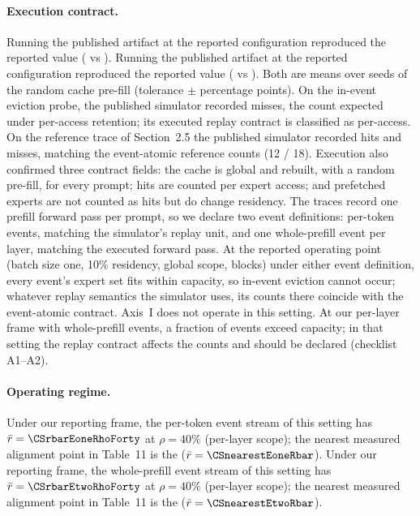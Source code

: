 \paragraph{Execution contract.}
Running the published artifact at the reported configuration reproduced the
reported value (\CSreproInfinity{} vs \CSreportedInfinity{}). Running the
published artifact at the reported configuration reproduced the reported value
(\CSreproBeyond{} vs \CSreportedBeyond{}). Both are means over \CSseeds{} seeds of the
random cache pre-fill (tolerance $\pm$\CSreproTolerance{} percentage points).
On the in-event
eviction probe, the published simulator recorded \CSprobeAtwoMisses{} misses,
the count expected under per-access retention; its executed replay contract is
classified as per-access. On the reference trace of Section~2.5 the published
simulator recorded \CSprobeAoneHits{} hits and \CSprobeAoneMisses{} misses,
matching the event-atomic reference counts (12 / 18). Execution also confirmed
three contract fields: the cache is global and rebuilt, with a random pre-fill,
for every prompt; hits are counted per expert access; and prefetched experts
are not counted as hits but do change residency. The traces record one prefill
forward pass per prompt, so we declare two event definitions: per-token events,
matching the simulator's replay unit, and one whole-prefill event per layer,
matching the executed forward pass. At the reported operating point
(batch size one, 10\% residency, global scope, \CStheirCapacity{} blocks) under
either event definition, every event's expert set fits within capacity, so
in-event eviction cannot occur; whatever replay semantics the simulator uses, its
counts there coincide with the event-atomic contract. Axis~I does not operate in
this setting. At our per-layer frame with whole-prefill events, a fraction
\CSoverCapEtwoPerLayerTen{} of events exceed capacity; in that setting the replay
contract affects the counts and should be declared (checklist A1--A2).

\paragraph{Operating regime.}
Under our reporting frame, the per-token event stream of this setting has
$\bar r = \CSrbarEoneRhoForty$ at $\rho = 40\%$ (per-layer scope); the nearest
measured alignment point in Table~11 is the \CSnearestEone{}
($\bar r = \CSnearestEoneRbar$). Under our reporting frame, the whole-prefill
event stream of this setting has $\bar r = \CSrbarEtwoRhoForty$ at $\rho = 40\%$
(per-layer scope); the nearest measured alignment point in Table~11 is the
\CSnearestEtwo{} ($\bar r = \CSnearestEtwoRbar$).

